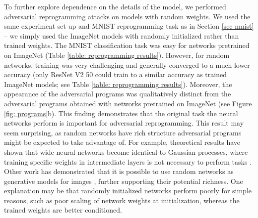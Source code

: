 \documentclass{article}
\begin{document}
To further explore dependence on the details of the model, we performed adversarial reprogramming attacks on models with random weights.
We used the same experiment set up and MNIST reprogramming task as in Section \ref{sec mnist} -- we simply used the ImageNet models with randomly initialized rather than trained weights.
The MNIST classification task was easy for networks pretrained on ImageNet (Table \ref{table: reprogramming results}). However, for random networks, training was very challenging and generally converged to a much lower accuracy (only ResNet V2 50 could train to a similar accuracy as trained ImageNet models; see Table \ref{table: reprogramming results}). Moreover, the appearance of the adversarial programs was qualitatively distinct from the adversarial programs obtained with networks pretrained on ImageNet (see Figure \ref{fig: programs}b). This finding demonstrates that the original task the neural networks perform is important for adversarial reprogramming.   
 This result may seem surprising, as random networks have rich structure adversarial programs might be expected to take advantage of. 
 For example, theoretical results have shown that wide neural networks become identical to Gaussian processes, where training specific weights in intermediate layers is not necessary to perform tasks \citep{matthews2018gaussian,lee2017deep}. Other work has demonstrated that it is possible to use random networks as generative models for images \citep{ustyuzhaninov2016texture, he2016powerful}, further supporting their potential richness. One explanation may be that randomly initialized networks perform poorly for simple reasons, such as poor scaling of network weights at initialization, whereas the trained weights are better conditioned. 
\end{document}
